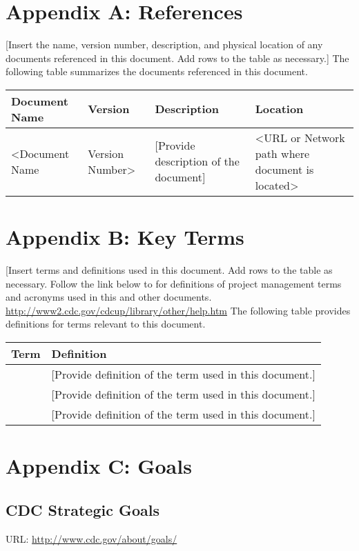 \documentclass[11pt]{article}
\begin{document}
\section{Appendix A: References}
\label{sec:org468d5a3}
[Insert the name, version number, description, and physical location of any documents referenced in this document.  Add rows to the table as necessary.] 
The following table summarizes the documents referenced in this document.
\begin{center}
\begin{tabular}{llll}
Document Name & Version & Description & Location\\
\hline
<Document Name & Version Number> & [Provide description of the document] & <URL or Network path where document is located>\\
\end{tabular}
\end{center}


\section{Appendix B: Key Terms}
\label{sec:org0451775}
[Insert terms and definitions used in this document.  Add rows to the table as necessary. Follow the link below to for definitions of project management terms and acronyms used in this and other documents.
\url{http://www2.cdc.gov/cdcup/library/other/help.htm}
The following table provides definitions for terms relevant to this document.
\begin{center}
\begin{tabular}{ll}
Term & Definition\\
\hline
[Insert Term] & [Provide definition of the term used in this document.]\\
[Insert Term] & [Provide definition of the term used in this document.]\\
[Insert Term] & [Provide definition of the term used in this document.]\\
\end{tabular}
\end{center}


\section{Appendix C: Goals}
\label{sec:org55e561d}
\subsection{CDC Strategic Goals}
\label{sec:org70b2634}
URL: \url{http://www.cdc.gov/about/goals/}
\end{document}
